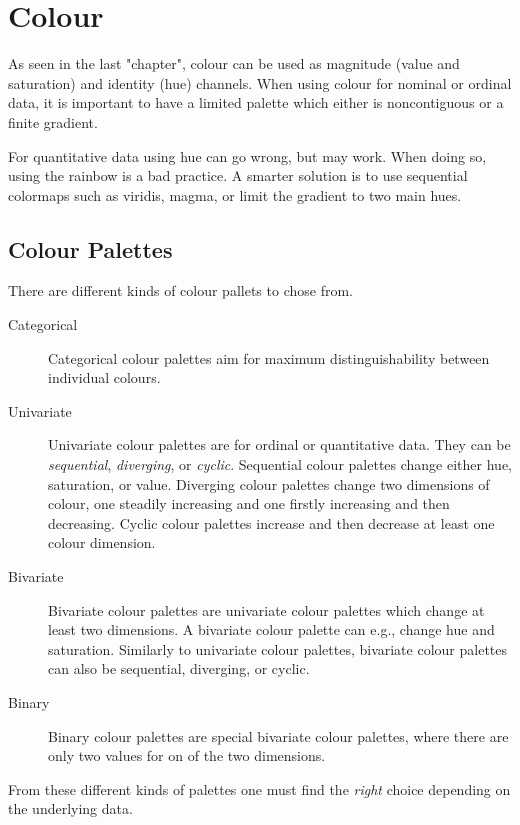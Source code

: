 \chapter{Colour}
As seen in the last "chapter", colour can be used as magnitude (value and saturation) and identity (hue) channels.
When using colour for nominal or ordinal data, it is important to have a limited palette which either is noncontiguous or a finite gradient.

For quantitative data using hue can go wrong, but may work.
When doing so, using the rainbow is a bad practice.
A smarter solution is to use sequential colormaps such as viridis, magma, or limit the gradient to two main hues.

\section{Colour Palettes}
There are different kinds of colour pallets to chose from.
\begin{description}
    \item[Categorical] Categorical colour palettes aim for maximum distinguishability between individual colours.

    \item[Univariate] Univariate colour palettes are for ordinal or quantitative data.
        They can be \emph{sequential}, \emph{diverging}, or \emph{cyclic}.
        Sequential colour palettes change either hue, saturation, or value.
        Diverging colour palettes change two dimensions of colour, one steadily increasing and one firstly increasing and then decreasing.
        Cyclic colour palettes increase and then decrease at least one colour dimension.

    \item[Bivariate] Bivariate colour palettes are univariate colour palettes which change at least two dimensions.
        A bivariate colour palette can e.g., change hue and saturation.
        Similarly to univariate colour palettes, bivariate colour palettes can also be sequential, diverging, or cyclic.

    \item[Binary] Binary colour palettes are special bivariate colour palettes, where there are only two values for on of the two dimensions.
\end{description}

\noindent
From these different kinds of palettes one must find the \emph{right} choice depending on the underlying data.

